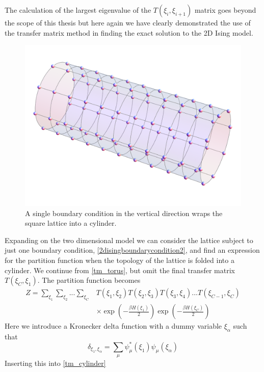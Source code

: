 %
The calculation of the largest eigenvalue of the $T\left(\xi_i,\xi_{i+1}\right)$ matrix goes beyond the scope of this thesis but here again we have clearly demonstrated the use of the transfer matrix method in finding the exact solution to the 2D Ising model.
%
\begin{figure}[bp]
\centering \includegraphics[scale=0.2]{Graphics/TransferMatrix/lattice_cylinder.png}
\caption{A single boundary condition in the vertical direction wraps the square lattice into a cylinder.}
\label{fig:cylinder} 
\end{figure}
%
Expanding on the two dimensional model we can consider the lattice subject to just one boundary condition, \eqref{2disingboundarycondition2}, and find an expression for the partition function when the topology of the lattice is folded into a cylinder.  We continue from \eqref{tm_torus}, but omit the final transfer matrix $T\left(\xi_C,\xi_1\right)$. The partition function becomes
%
\begin{align}
\label{tm_cylinder}
Z=\sum_{\xi_1}\sum_{\xi_2}...\sum_{\xi_C}&T\left(\xi_1,\xi_2\right)T\left(\xi_2,\xi_3\right)T\left(\xi_3,\xi_4\right)...T\left(\xi_{C-1},\xi_C\right)\\
&\times\exp\left(-\frac{\beta H\left( \xi_1\right)}{2}\right)\exp\left(-\frac{\beta H\left( \xi_C\right)}{2}\right)
\end{align}
%
Here we introduce a Kronecker delta function with a dummy variable $\xi_\alpha$ such that
%
\begin{equation}\label{bc_cylin}
\delta_{\xi_1,\xi_\alpha}=\sum_{\mu}\psi_{\mu}^{*}\left(\xi_{1} \right)\psi_{\mu}\left(\xi_{\alpha}\right)
\end{equation}
%
Inserting this into \eqref{tm_cylinder} 


